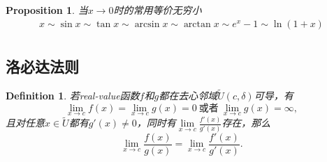 \documentclass{article}
\newtheorem{proposition}[theorem]{Proposition}
\newtheorem{definition}[theorem]{Definition}
\begin{document}
\begin{proposition}
\rm 当$x \to 0$时的常用等价无穷小
$$
\begin{array}{ll}
x \sim \sin x \sim \tan x \sim \arcsin x \sim \arctan x \sim e^x-1 \sim \ln(1+x) \\
\end{array}
$$
\end{proposition}

\subsection{洛必达法则}

\begin{definition}
\rm 若real-value函数$f$和$g$都在去心邻域$\tilde{U}(c,\delta)$可导，有
$$
\lim\limits_{x \rightarrow c} f(x) = \lim\limits_{x \rightarrow c} g(x) = 0 ~\text{或者}~ \lim\limits_{x \rightarrow c} g(x) = \infty,
$$
且对任意$x \in \tilde{U}$都有$g'(x) \neq 0$，同时有$\lim\limits_{x \rightarrow c}\frac{f'(x)}{g'(x)}$存在，那么
$$
\lim\limits_{x \rightarrow c} \frac{f(x)}{g(x)} = \lim\limits_{x \rightarrow c} \frac{f'(x)}{g'(x)}.
$$
\end{definition}
\end{document}

